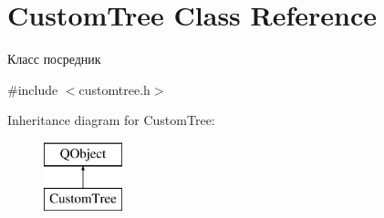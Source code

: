 \hypertarget{class_custom_tree}{}\section{Custom\+Tree Class Reference}
\label{class_custom_tree}


Класс посредник  




{\ttfamily \#include $<$customtree.\+h$>$}

Inheritance diagram for Custom\+Tree\+:\begin{figure}[H]
\begin{center}
\leavevmode
\includegraphics[height=2.000000cm]{class_custom_tree}
\end{center}
\end{figure}
